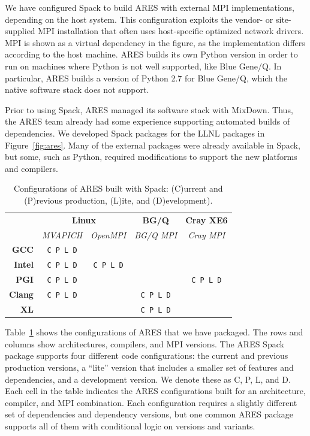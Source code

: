 We have configured Spack to build ARES with external MPI implementations, 
depending on the host system. This configuration exploits the vendor- 
or site-supplied MPI installation that often uses host-specific optimized 
network drivers. MPI is shown as a virtual dependency in the figure, as 
the implementation differs according to the host machine.  ARES builds its 
own Python version in order to run on machines where Python is not well 
supported, like Blue Gene/Q.  In particular, ARES builds a version of 
Python 2.7 for Blue Gene/Q, which the native software stack does not support.

Prior to using Spack, ARES managed its software stack with MixDown.
Thus, the ARES team already had some experience supporting 
automated builds of dependencies. We developed Spack packages for the LLNL 
packages in Figure~\ref{fig:ares}. Many of the external packages were already 
available in Spack, but some, such as Python, required modifications to support
the new platforms and compilers.

\begin{table}\centering
\begin{tabular}{|r|c|c|c|c|}
\hline
\multirow{2}{*}{} & \multicolumn{2}{|c|}{\bf Linux} & {\bf BG/Q}     & {\bf Cray XE6} \\\cline{2-5}
                  & {\it MVAPICH} & {\it OpenMPI}   & {\it BG/Q MPI} & {\it Cray MPI} \\\hline
{\bf GCC}         & {\tt C P L D} &                 &                &                \\\hline
{\bf Intel}       & {\tt C P L D} & {\tt C P L D}   &                &                \\\hline
{\bf PGI}         & {\tt C P L D} &                 &                & {\tt C P L D}  \\\hline
{\bf Clang}       & {\tt C P L D} &                 & {\tt C P L D}  &                \\\hline
{\bf XL}          &               &                 & {\tt C P L D}  &                \\\hline
\end{tabular}
\caption{
	Configurations of ARES built with Spack: \newline
	(C)urrent and
	(P)revious production, (L)ite, and (D)evelopment).
	\label{tab:ares-configs}
}
\end{table}

Table~\ref{tab:ares-configs} shows the configurations of ARES that we have packaged.
The rows and columns show architectures, compilers, and MPI versions.
The ARES Spack package supports four different code configurations:
the current and previous production versions, a ``lite'' version that includes
a smaller set of features and dependencies, and a development version.  We 
denote these as C, P, L, and D. Each cell in the table indicates the
ARES configurations built for an architecture, compiler, and MPI combination.
Each configuration requires a slightly different set of dependencies and 
dependency versions, but one common ARES package supports all of them with 
conditional logic on versions and variants.

